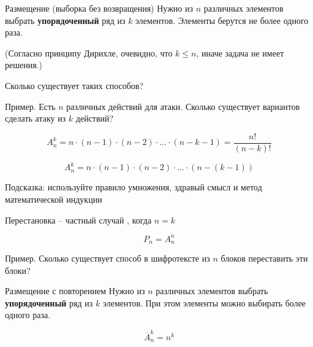 \begin{frame}{Размещение (выборка без возвращения)}
Нужно из
$n$
различных элементов 
выбрать \textbf{упорядоченный}
ряд из $k$
элементов. 
Элементы берутся не более одного раза.

(Согласно принципу Дирихле, очевидно, что $k \leqslant n$,
иначе задача не имеет решения.)


Сколько существует таких способов?   

Пример.
Есть $n$ различных действий для атаки.
Сколько существует вариантов сделать атаку из $k$ действий?

\begin{equation}
A_n^k = n \cdot (n-1) \cdot (n-2) \cdot ... \cdot (n-k-1) = \frac{n!} {\left(n-k\right)!}
\end{equation}    


\end{frame}

\begin{frame}


\begin{equation}
A_n^k = n \cdot (n-1) \cdot (n-2) \cdot ... \cdot \left(n-(k-1)\right)
\end{equation}  

Подсказка: используйте правило умножения, здравый смысл 
и метод математической индукции

\end{frame}



\begin{frame}{Перестановка}
 -- 
частный случай , 
когда $n=k$ 

\begin{equation}
P_n = A_n^n
\end{equation}

Пример. Сколько существует способ в шифротексте из $n$ блоков переставить эти блоки?
\end{frame}


\begin{frame}{Размещение с повторением}
Нужно из
$n$
различных элементов 
выбрать \textbf{упорядоченный}
ряд из $k$
элементов. 
При этом элементы можно выбирать более одного раза.

\begin{equation}
\overline{A}_n^k = n ^ k
\end{equation} 

\end{frame}


